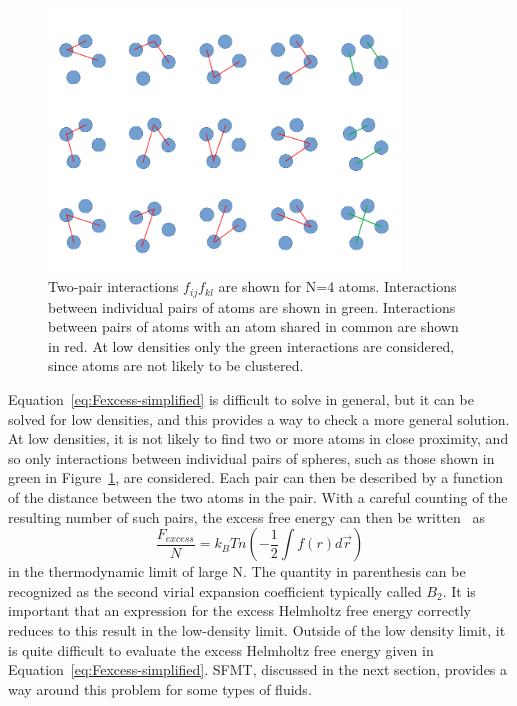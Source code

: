 \documentclass[double,12pt]{beavtex}
\begin{document}
  \begin{figure}
    \centering
    \includegraphics[height=7cm]{figs/diagrammic.pdf}
    \caption{Two-pair interactions $f_{ij}f_{kl}$ are shown for N=4 atoms. 
    Interactions between individual pairs of atoms are shown in green. 
    Interactions between pairs of atoms with an atom shared in common 
    are shown in red. At low densities only the green interactions
    are considered, since atoms are not likely to be clustered.}
    \label{fig:diagrammic}
  \end{figure}

Equation~\ref{eq:Fexcess-simplified} is difficult to solve in general, 
but it can be solved for low densities, and this provides a way to check
a more general solution.
At low densities, it is not likely to find two or more atoms in close 
proximity, and so only interactions between individual pairs of spheres, 
such as those shown in green in Figure~\ref{fig:diagrammic}, are considered.
Each pair can then be described by a function of the distance between the 
two atoms in the pair. 
With a careful counting of the resulting number of such pairs, the excess 
free energy can then be written~\cite{schroeder} as
\begin{equation}\label{eq:Fexcess}{\frac{F_{excess}}{N}=k_BTn\left(-\frac{1}{2}\int{f(r)}{d\vec{r}}\right)}\end{equation} 
in the thermodynamic limit of large N. 
The quantity in parenthesis can be recognized 
as the second virial expansion coefficient typically called $B_2$. 
It is important that an expression for the excess Helmholtz free energy 
correctly reduces to this result in the low-density limit. 
Outside of the low density limit, it is quite difficult to evaluate the 
excess Helmholtz free energy given in Equation~\ref{eq:Fexcess-simplified}. 
SFMT, discussed in the next section, provides a way around this problem
for some types of fluids.
\end{document}
